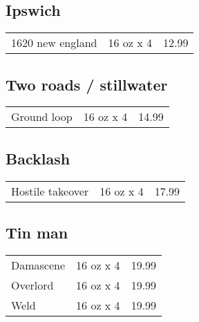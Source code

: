 \documentclass{article}%
\begin{document}
\begin{multicols}{3}
%
\subsection*{Ipswich}%
\begin{tabular}{l c r}%
1620 new england&16 oz x 4&12.99\\%
\end{tabular}

%
\subsection*{Two roads / stillwater}%
\begin{tabular}{l c r}%
Ground loop&16 oz x 4&14.99\\%
\end{tabular}

%
\subsection*{Backlash}%
\begin{tabular}{l c r}%
Hostile takeover&16 oz x 4&17.99\\%
\end{tabular}

%
\subsection*{Tin man}%
\begin{tabular}{l c r}%
Damascene&16 oz x 4&19.99\\%
Overlord&16 oz x 4&19.99\\%
Weld&16 oz x 4&19.99\\%
\end{tabular}

%
\end{multicols}%
\end{document}
